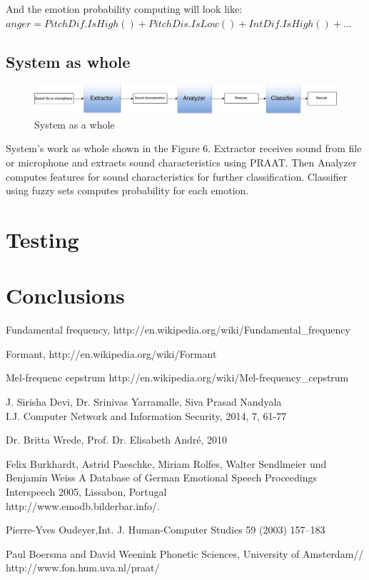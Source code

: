 \documentclass[12pt, letterpaper]{article}
\begin{document}
And the emotion probability computing will look like:\\ $anger=PitchDif.IsHigh() + PitchDis.IsLow() + IntDif.IsHigh() + ...$

\subsection{System as whole}

\begin{figure}[h]
	\centering
		\includegraphics[scale=0.3]{images/components.png}
	\caption{System as a whole}
	\label{fig:system}
\end{figure}

System's work as whole shown in the Figure 6. Extractor receives sound from file or microphone and extracts sound characteristics using PRAAT. Then Analyzer computes features for sound characteristics for further classification. Classifier using fuzzy sets computes probability for each emotion.

\section{Testing}

\section{Conclusions}




\begin{thebibliography}{9}

Fundamental frequency,
http://en.wikipedia.org/wiki/Fundamental\_frequency

Formant,
http://en.wikipedia.org/wiki/Formant

Mel-frequenc cepstrum
http://en.wikipedia.org/wiki/Mel-frequency\_cepstrum

J. Sirisha Devi, Dr. Srinivas Yarramalle, Siva Prasad Nandyala\\
I.J. Computer Network and Information Security, 2014, 7, 61-77

 Dr. Britta Wrede, Prof. Dr. Elisabeth André, 2010

 Felix Burkhardt, Astrid Paeschke, Miriam Rolfes, Walter Sendlmeier und Benjamin Weiss
A Database of German Emotional Speech
Proceedings Interspeech 2005, Lissabon, Portugal\\
http://www.emodb.bilderbar.info/.

 Pierre-Yves Oudeyer,Int. J. Human-Computer Studies 59 (2003) 157–183

 Paul Boersma and David Weenink   
Phonetic Sciences, University of Amsterdam//
http://www.fon.hum.uva.nl/praat/
\end{thebibliography}
\end{document}
